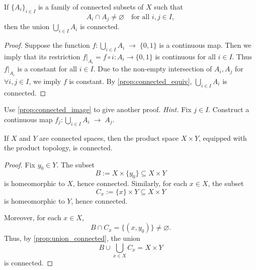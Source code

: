 \begin{proposition} \label{prop:union_connected}
If \(\{A_i\}_{i \in I}\) is a family of connected subsets of \(X\) such that 
\[
A_i \cap A_j \neq \varnothing \quad \text{for all } i,j \in I,
\]
then the union \(\bigcup_{i \in I} A_i\) is connected.
\end{proposition}

\begin{proof}
Suppose the function \(f : \bigcup\limits_{i \in I} A_i \;\longrightarrow\; \{0,1\}\) is a continuous map. Then we imply that its restriction \({\left. f\right| }_{{A}_{i}} = f \circ  i : {A}_{i} \rightarrow  \{ 0,1\}\) is continuous for all \(i \in  I\). Thus \({\left. f\right| }_{{A}_{i}}\) is a constant for all \(i \in  I\). Due to the non-empty intersection of \({A}_{i},{A}_{j}\) for \(\forall i,j \in  I\), we imply \(f\) is constant. By \autoref{prop:connected_equiv},  \(\bigcup\limits_{i \in I} A_i\) is connected.
\end{proof}

\begin{exercise}
    Use \autoref{prop:connected_image} to give another proof. \emph{Hint.} Fix \(j \in I\). Construct a continuous map
\(
f_j : \bigcup_{i \in I} A_i \;\longrightarrow\; A_j.
\)
\end{exercise}


\begin{proposition} \label{prop:product_connected}
If \(X\) and \(Y\) are connected spaces, then the product space \(X \times Y\), equipped with the product topology, is connected.
\end{proposition}

\begin{proof}
Fix \(y_0 \in Y\). The subset
\[
B := X \times \{ y_0 \} \subseteq X \times Y
\]
is homeomorphic to \(X\), hence connected.  
Similarly, for each \(x \in X\), the subset
\[
C_x := \{x\} \times Y \subseteq X \times Y
\]
is homeomorphic to \(Y\), hence connected.  

Moreover, for each \(x \in X\),
\[
B \cap C_x = \{(x,y_0)\} \neq \varnothing.
\]
Thus, by \autoref{prop:union_connected}, the union
\[
B \cup \bigcup_{x \in X} C_x = X \times Y
\]
is connected.
\end{proof}

